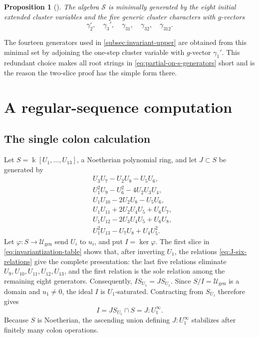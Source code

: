 \documentclass[11pt,reqno]{amsart}
\numberwithin{equation}{section}
\newtheorem{proposition}[proposition]{Proposition}
\theoremstyle{remark}
\newcommand{\kk}{\Bbbk}
\newcommand{\SR}{\mathscr S}
\newcommand{\Ugen}{\mathscr U_{\mathrm{gen}}}
\begin{document}
\begin{proposition}[{\cite[Proposition~9.5]{Fk1}}]
\label{prop:partial-minimal-generators}
The algebra $\SR$ is minimally generated by the eight initial
extended cluster variables and the five generic cluster characters with
$g$-vectors
\[ \gamma_2^\circ,\quad\gamma_3',\quad \gamma_{31},\quad\gamma_{32},\quad\gamma_{312}. \]
\end{proposition}

The fourteen generators used in \cref{subsec:invariant-upper} are obtained
from this minimal set by adjoining the one-step cluster variable with
$g$-vector $\gamma_1'$.  This redundant choice makes all root strings in
\eqref{eq:partial-on-s-generators} short and is the reason the two-slice proof has
the simple form there.

\section{A regular-sequence computation}
\label{app:regular-sequence-certificate}

\subsection{The single colon calculation}
\label{app:regular-sequence}

Let $S=\kk[U_1,\ldots,U_{13}]$, a Noetherian polynomial ring, and let
$J\subset S$ be generated by
\begin{equation}
\label{eq:J-six-relations}
 \begin{aligned}
 &U_3U_7-U_2U_8-U_5U_6,\\
 &U_1^2U_9-U_6^2-4U_2U_3U_4,\\
 &U_1U_{10}-2U_2U_8-U_5U_6,\\
 &U_1U_{11}+2U_2U_4U_5+U_6U_7,\\
 &U_1U_{12}-2U_3U_4U_5+U_6U_8,\\
 &U_1^2U_{13}-U_7U_8+U_4U_5^2.
 \end{aligned}
\end{equation}
Let $\varphi:S\to\Ugen$ send $U_i$ to $u_i$, and put
$I=\ker\varphi$.  The first slice in
\eqref{eq:invariantization-table} shows that, after inverting $U_1$, the
relations \eqref{eq:J-six-relations} give the complete presentation: the
last five relations eliminate $U_9,U_{10},U_{11},U_{12},U_{13}$, and the
first relation is the sole relation among the remaining eight generators.
Consequently, $I S_{U_1}=J S_{U_1}$.  Since
$S/I=\Ugen$ is a domain and $u_1\ne0$, the ideal $I$ is
$U_1$-saturated.  Contracting from $S_{U_1}$ therefore gives
\[ I=J S_{U_1}\cap S=J:U_1^\infty. \]
Because $S$ is Noetherian, the ascending union defining
$J:U_1^\infty$ stabilizes after finitely many colon operations.
\end{document}
